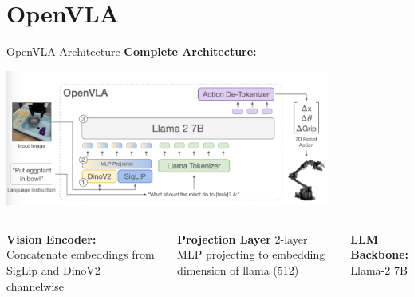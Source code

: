 \documentclass{beamer}
\begin{document}
\section{OpenVLA}
\begin{frame}[t]{OpenVLA Architecture}
    \textbf{Complete Architecture:}
    \begin{center}
        \includegraphics[width=0.8\textwidth]{./img/openvla_arch.png}
    \end{center}
    \begin{columns}
        \hspace{0.5em}
		\begin{column}[t]{.33\textwidth}
            \textbf{Vision Encoder:}\newline
            \small
            Concatenate embeddings from SigLip and DinoV2 channelwise
		\end{column}
        \hspace{0em}
		\begin{column}[t]{.33\textwidth}
            \textbf{Projection Layer}\newline
            \small
            2-layer MLP projecting to embedding dimension of llama (512)
		\end{column}
        \hspace{0.25em}
		\begin{column}[t]{.33\textwidth}
            \textbf{LLM Backbone:}\newline
            \small
            Llama-2 7B
		\end{column}
	\end{columns}
\end{frame}
\end{document}
